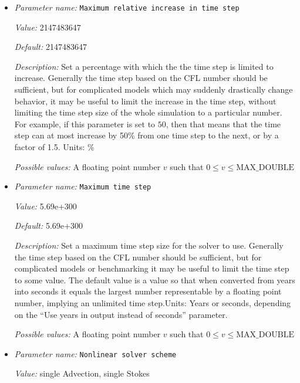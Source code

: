 \begin{itemize}
{\it Possible values:} A floating point number $v$ such that $0 \leq v \leq \text{MAX\_DOUBLE}$
\item {\it Parameter name:} {\tt Maximum relative increase in time step}
\label{parameters:Maximum relative increase in time step}


{\it Value:} 2147483647


{\it Default:} 2147483647


{\it Description:} Set a percentage with which the the time step is limited to increase. Generally the time step based on the CFL number should be sufficient, but for complicated models which may suddenly drastically change behavior, it may be useful to limit the increase in the time step, without limiting the time step size of the whole simulation to a particular number. For example, if this parameter is set to $50$, then that means that the time step can at most increase by 50\% from one time step to the next, or by a factor of 1.5. Units: \%


{\it Possible values:} A floating point number $v$ such that $0 \leq v \leq \text{MAX\_DOUBLE}$
\item {\it Parameter name:} {\tt Maximum time step}
\label{parameters:Maximum time step}


{\it Value:} 5.69e+300


{\it Default:} 5.69e+300


{\it Description:} Set a maximum time step size for the solver to use. Generally the time step based on the CFL number should be sufficient, but for complicated models or benchmarking it may be useful to limit the time step to some value. The default value is a value so that when converted from years into seconds it equals the largest number representable by a floating point number, implying an unlimited time step.Units: Years or seconds, depending on the ``Use years in output instead of seconds'' parameter.


{\it Possible values:} A floating point number $v$ such that $0 \leq v \leq \text{MAX\_DOUBLE}$
\item {\it Parameter name:} {\tt Nonlinear solver scheme}
\label{parameters:Nonlinear solver scheme}


{\it Value:} single Advection, single Stokes



\end{itemize}
